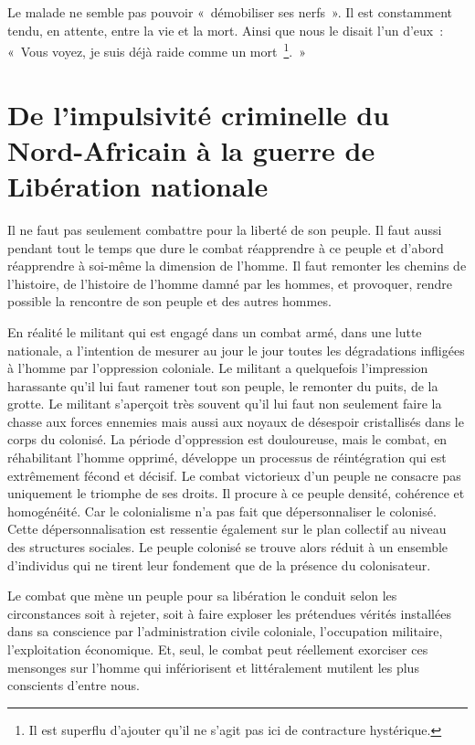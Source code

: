 \documentclass[french,twoside]{book} %
\begin{document}
Le malade ne semble pas pouvoir « démobiliser ses nerfs ». Il est constamment tendu, en attente, entre la vie et la mort. Ainsi que nous le disait l’un d’eux : « Vous voyez, je suis déjà raide comme un mort \footnote{Il est superflu d’ajouter qu’il ne s’agit pas ici de contracture hystérique.}. »\par
 \section[{De l’impulsivité criminelle du Nord-Africain à la guerre de Libération nationale}]{De l’impulsivité criminelle du Nord-Africain à la guerre de Libération nationale}
\noindent Il ne faut pas seulement combattre pour la liberté de son peuple. Il faut aussi pendant tout le temps que dure le combat réapprendre à ce peuple et d’abord réapprendre à soi-même la dimension de l’homme. Il faut remonter les chemins de l’histoire, de l’histoire de l’homme damné par les hommes, et provoquer, rendre possible la rencontre de son peuple et des autres hommes.\par
\bigbreak
\noindent En réalité le militant qui est engagé dans un combat armé, dans une lutte nationale, a l’intention de mesurer au jour le jour toutes les dégradations infligées à l’homme par l’oppression coloniale. Le militant a quelquefois l’impression harassante qu’il lui faut ramener tout son peuple, le remonter du puits, de la grotte. Le militant s’aperçoit très souvent qu’il lui faut non seulement faire la chasse aux forces ennemies mais aussi aux noyaux de désespoir cristallisés dans le corps du colonisé. La période d’oppression est douloureuse, mais le combat, en réhabilitant l’homme opprimé, développe un processus de réintégration qui est extrêmement fécond et décisif. Le combat victorieux d’un peuple ne consacre pas uniquement le triomphe de ses droits. Il procure à ce peuple densité, cohérence et homogénéité. Car le colonialisme n’a pas fait que dépersonnaliser le colonisé. Cette dépersonnalisation est ressentie également sur le plan collectif au niveau des structures sociales. Le peuple colonisé se trouve alors réduit à un ensemble d’individus qui ne tirent leur fondement que de la présence du colonisateur.\par
  Le combat que mène un peuple pour sa libération le conduit selon les circonstances soit à rejeter, soit à faire exploser les prétendues vérités installées dans sa conscience par l’administration civile coloniale, l’occupation militaire, l’exploitation économique. Et, seul, le combat peut réellement exorciser ces mensonges sur l’homme qui infériorisent et littéralement mutilent les plus conscients d’entre nous.\par
\end{document}
